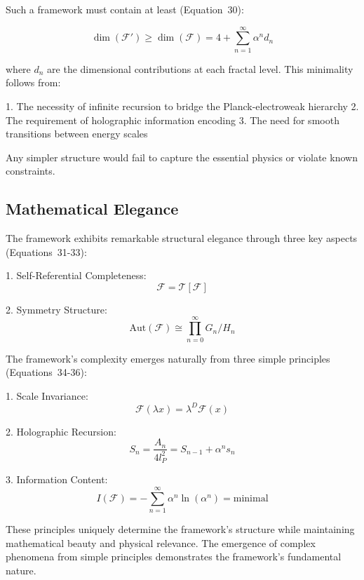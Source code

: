 \documentclass{article}
\begin{document}
Such a framework must contain at least (Equation~30):

\begin{equation}
\dim(\mathcal{F}') \geq \dim(\mathcal{F}) = 4 + \sum_{n=1}^{\infty} \alpha^n d_n
\end{equation}

where $d_n$ are the dimensional contributions at each fractal level. This minimality follows from:

1. The necessity of infinite recursion to bridge the Planck-electroweak hierarchy
2. The requirement of holographic information encoding
3. The need for smooth transitions between energy scales

Any simpler structure would fail to capture the essential physics or violate known constraints.

\subsection{Mathematical Elegance}

The framework exhibits remarkable structural elegance through three key aspects (Equations~31-33):

1. Self-Referential Completeness:
   \begin{equation}
   \mathcal{F} = \mathcal{T}[\mathcal{F}]
   \end{equation}

2. Symmetry Structure:
   \begin{equation}
   \text{Aut}(\mathcal{F}) \cong \prod_{n=0}^{\infty} G_n/H_n
   \end{equation}

The framework's complexity emerges naturally from three simple principles (Equations~34-36):

1. Scale Invariance:
   \begin{equation}
   \mathcal{F}(\lambda x) = \lambda^D \mathcal{F}(x)
   \end{equation}

2. Holographic Recursion:
   \begin{equation}
   S_n = \frac{A_n}{4l_P^2} = S_{n-1} + \alpha^n s_n
   \end{equation}

3. Information Content:
   \begin{equation}
   I(\mathcal{F}) = -\sum_{n=1}^{\infty} \alpha^n \ln(\alpha^n) = \text{minimal}
   \end{equation}

These principles uniquely determine the framework's structure while maintaining mathematical beauty and physical relevance. The emergence of complex phenomena from simple principles demonstrates the framework's fundamental nature.
\end{document}
